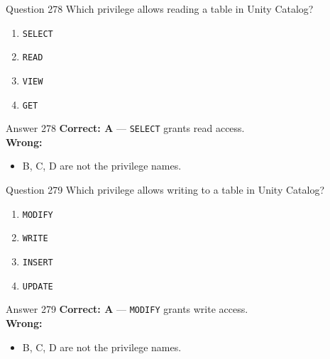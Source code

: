 \documentclass[aspectratio=169,11pt]{beamer}
\begin{document}
	\begin{frame}{Question 278}
		Which privilege allows reading a table in Unity Catalog?
		\begin{enumerate}[label=\Alph*.]
			\item \texttt{SELECT}
			\item \texttt{READ}
			\item \texttt{VIEW}
			\item \texttt{GET}
		\end{enumerate}
	\end{frame}
	\begin{frame}{Answer 278}
		\textbf{Correct: A} --- \texttt{SELECT} grants read access.\\
		\vspace{0.5em}
		\textbf{Wrong:}
		\begin{itemize}
			\item B, C, D are not the privilege names.
		\end{itemize}
	\end{frame}
	
	\begin{frame}{Question 279}
		Which privilege allows writing to a table in Unity Catalog?
		\begin{enumerate}[label=\Alph*.]
			\item \texttt{MODIFY}
			\item \texttt{WRITE}
			\item \texttt{INSERT}
			\item \texttt{UPDATE}
		\end{enumerate}
	\end{frame}
	\begin{frame}{Answer 279}
		\textbf{Correct: A} --- \texttt{MODIFY} grants write access.\\
		\vspace{0.5em}
		\textbf{Wrong:}
		\begin{itemize}
			\item B, C, D are not the privilege names.
		\end{itemize}
	\end{frame}
	
\end{document}
